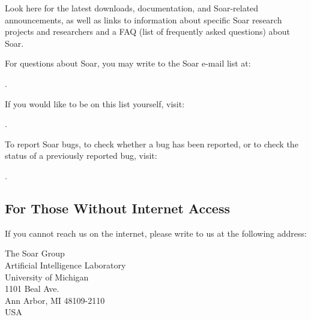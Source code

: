 Look here for the latest downloads, documentation, and Soar-related announcements, as well
as links to information about specific Soar research projects and researchers and a FAQ
(list of frequently asked questions) about Soar.

For questions about Soar, you may write to the Soar e-mail list at:

\hspace{2em}.

If you would like to be on this list yourself, visit:

\hspace{2em}.

To report Soar bugs, to check whether a bug has been reported, or to check the status
of a previously reported bug, visit:

\hspace{2em}.


 




\subsection*{For Those Without Internet Access}

If you cannot reach us on the internet, please write to us at the following 
address:

\begin{flushleft}
\hspace{2em}The Soar Group \\
\hspace{2em}Artificial Intelligence Laboratory \\
\hspace{2em}University of Michigan\\
\hspace{2em}1101 Beal Ave.\\
\hspace{2em}Ann Arbor, MI 48109-2110 \\
\hspace{2em}USA 
\end{flushleft}

